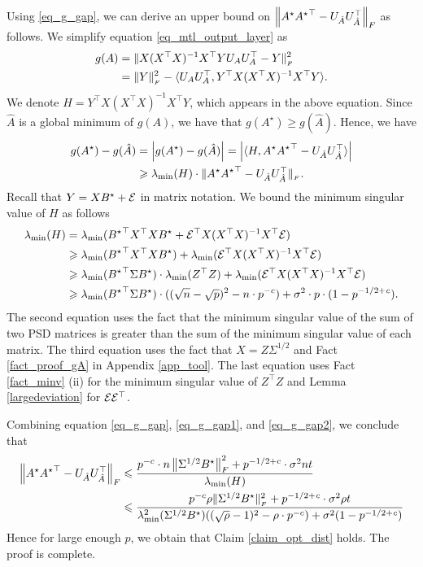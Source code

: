 	Using \eqref{eq_g_gap}, we can derive an upper bound on $\left\| A^{\star} {A^{\star}}^{\top}- U_{\hat{A}} U_{\hat{A}}^{\top} \right\|_{F}$ as follows.
	We simplify equation \eqref{eq_mtl_output_layer} as
	\begin{align*}
		g(A)  &= \|X (X^{\top}X)^{-1} X^{\top} Y U_A U_A^{\top} - Y\|_{_{F}}^2 \\
					&= \|Y\|_{_{F}}^2 - \langle U_A U_A^{\top}, Y^{\top} X (X^{\top} X)^{-1} X^{\top} Y \rangle.
	\end{align*}
	We denote $H = Y^{\top} X (X^{\top} X)^{-1} X^{\top} Y$, which appears in the above equation.
	Since $\hat{A}$ is a global minimum of $g(A)$, we have that $g(A^{\star}) \ge g(\hat{A})$.
	Hence, we have
	\begin{align}
		g(A^{\star}) - g(\hat{A}) &= \left\lvert g(A^{\star}) - g(\hat{A})\right\rvert = \left\lvert\langle H, A^{\star} {A^{\star}}^{\top} - U_{\hat{A}} U_{\hat{A}}^{\top} \rangle\right\rvert \nonumber \\
												&\geqslant \lambda_{\min}(H) \cdot \|A^{\star} {A^{\star}}^{\top} - U_{\hat{A}} U_{\hat{A}}^{\top}\|_{_{F}}. \label{eq_g_gap1}
	\end{align}
	Recall that $Y = X B^{\star} + \mathcal{E}$ in matrix notation.
	We bound the minimum singular value of $H$ as follows
	\begin{align}
		\lambda_{\min}(H) &= \lambda_{\min}({B^{\star}}^{\top} X^{\top} X B^{\star} + \mathcal{E}^{\top} X (X^{\top} X)^{-1} X^{\top} \mathcal{E}) \nonumber \\
		&\geqslant \lambda_{\min}({B^{\star}}^{\top}X^{\top}X B^{\star}) + \lambda_{\min}(\mathcal{E}^{\top} X (X^{\top} X)^{-1} X^{\top} \mathcal{E}) \nonumber \\
		&\geqslant \lambda_{\min}({B^{\star}}^{\top}\Sigma B^{\star}) \cdot \lambda_{\min}(Z^{\top}Z) + \lambda_{\min}(\mathcal{E}^{\top} X (X^{\top} X)^{-1} X^{\top} \mathcal{E}) \nonumber \\
		&\geqslant \lambda_{\min}({B^{\star}}^{\top}\Sigma B^{\star}) \cdot ((\sqrt n - \sqrt p)^2 - n \cdot p^{-c}) + \sigma^2 \cdot p \cdot (1 - p^{-1/2 + {\mathit{c}}}). \label{eq_g_gap2}
	\end{align}
	The second equation uses the fact that the minimum singular value of the sum of two PSD matrices is greater than the sum of the minimum singular value of each matrix.
	The third equation uses the fact that $X = Z \Sigma^{1/2}$ and Fact \ref{fact_proof_gA} in Appendix \ref{app_tool}.
	The last equation uses Fact \ref{fact_minv} (ii) for the minimum singular value of $Z^{\top}Z$ and Lemma \ref{largedeviation} for $\mathcal{E}\mathcal{E}^{\top}$.

	Combining equation \eqref{eq_g_gap}, \eqref{eq_g_gap1}, and \eqref{eq_g_gap2}, we conclude that
	\begin{align*}
		\left\| A^{\star} {A^{\star}}^{\top}- U_{\hat{A}} U_{\hat{A}}^{\top} \right\|_{F}
		&\leqslant \frac{p^{-c} \cdot n \left\| \Sigma^{1/2} B^{\star} \right\|_{F}^2 + p^{-1/2 + c} \cdot \sigma^2 nt} {\lambda_{\min}(H)} \\
		&\leqslant \frac{p^{-c} \rho \|\Sigma^{1/2} B^{\star}\|_{_{F}}^2 + p^{-1/2 + {\mathit{c}}} \cdot \sigma^2 \rho t}{\lambda_{\min}^2(\Sigma^{1/2} B^{\star}) ((\sqrt{\rho} - 1)^2 - \rho \cdot p^{-c}) + \sigma^2 (1 - p^{-1/2 + {\mathit{c}}})}
	\end{align*}
	Hence for large enough $p$, we obtain that Claim \ref{claim_opt_dist} holds.
	The proof is complete.

